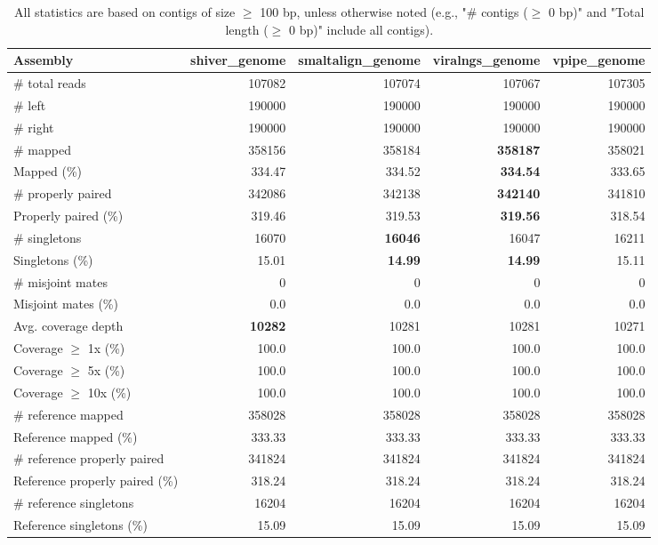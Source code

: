 \documentclass[12pt,a4paper]{article}
\begin{document}
\begin{table}[ht]
\begin{center}
\caption{All statistics are based on contigs of size $\geq$ 100 bp, unless otherwise noted (e.g., "\# contigs ($\geq$ 0 bp)" and "Total length ($\geq$ 0 bp)" include all contigs).}
\begin{tabular}{|l*{4}{|r}|}
\hline
Assembly & shiver\_genome & smaltalign\_genome & viralngs\_genome & vpipe\_genome \\ \hline
\# total reads & 107082 & 107074 & 107067 & 107305 \\ \hline
\# left & 190000 & 190000 & 190000 & 190000 \\ \hline
\# right & 190000 & 190000 & 190000 & 190000 \\ \hline
\# mapped & 358156 & 358184 & {\bf 358187} & 358021 \\ \hline
Mapped (\%) & 334.47 & 334.52 & {\bf 334.54} & 333.65 \\ \hline
\# properly paired & 342086 & 342138 & {\bf 342140} & 341810 \\ \hline
Properly paired (\%) & 319.46 & 319.53 & {\bf 319.56} & 318.54 \\ \hline
\# singletons & 16070 & {\bf 16046} & 16047 & 16211 \\ \hline
Singletons (\%) & 15.01 & {\bf 14.99} & {\bf 14.99} & 15.11 \\ \hline
\# misjoint mates & 0 & 0 & 0 & 0 \\ \hline
Misjoint mates (\%) & 0.0 & 0.0 & 0.0 & 0.0 \\ \hline
Avg. coverage depth & {\bf 10282} & 10281 & 10281 & 10271 \\ \hline
Coverage $\geq$ 1x (\%) & 100.0 & 100.0 & 100.0 & 100.0 \\ \hline
Coverage $\geq$ 5x (\%) & 100.0 & 100.0 & 100.0 & 100.0 \\ \hline
Coverage $\geq$ 10x (\%) & 100.0 & 100.0 & 100.0 & 100.0 \\ \hline
\# reference mapped & 358028 & 358028 & 358028 & 358028 \\ \hline
Reference mapped (\%) & 333.33 & 333.33 & 333.33 & 333.33 \\ \hline
\# reference properly paired & 341824 & 341824 & 341824 & 341824 \\ \hline
Reference properly paired (\%) & 318.24 & 318.24 & 318.24 & 318.24 \\ \hline
\# reference singletons & 16204 & 16204 & 16204 & 16204 \\ \hline
Reference singletons (\%) & 15.09 & 15.09 & 15.09 & 15.09 \\ \hline

\end{tabular}
\end{center}
\end{table}
\end{document}
